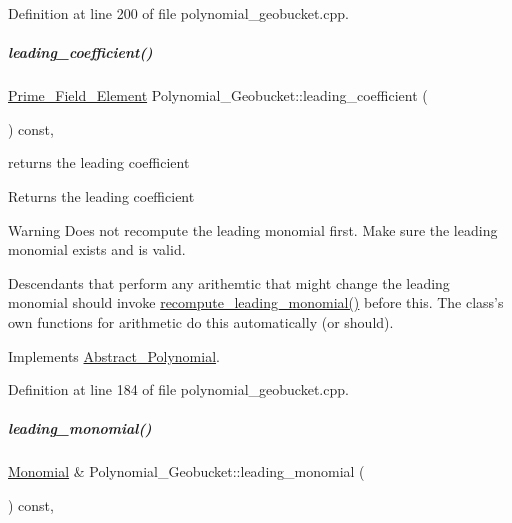 Definition at line 200 of file polynomial\+\_\+geobucket.\+cpp.

\mbox{\label{group__polygroup_a096aa08d1d7be3522c140908989e4dea}} 
\subparagraph{\texorpdfstring{leading\+\_\+coefficient()}{leading\_coefficient()}}
{\footnotesize\ttfamily \hyperlink{group___fields_group_class_prime___field___element}{Prime\+\_\+\+Field\+\_\+\+Element} Polynomial\+\_\+\+Geobucket\+::leading\+\_\+coefficient (\begin{DoxyParamCaption}{ }\end{DoxyParamCaption}) const\hspace{0.3cm}{\ttfamily [override]}, {\ttfamily [virtual]}}



returns the leading coefficient 

\begin{DoxyReturn}{Returns}
the leading coefficient 
\end{DoxyReturn}
\begin{DoxyWarning}{Warning}
Does not recompute the leading monomial first. Make sure the leading monomial exists and is valid. 

Descendants that perform any arithemtic that might change the leading monomial should invoke \hyperlink{group__polygroup_ab57dbe8d5f0d3860997775d9f354ab0c}{recompute\+\_\+leading\+\_\+monomial()} before this. The class's own functions for arithmetic do this automatically (or should). 
\end{DoxyWarning}


Implements \hyperlink{group__polygroup_a511ce8e997fe3fd1141293d256e25fad}{Abstract\+\_\+\+Polynomial}.



Definition at line 184 of file polynomial\+\_\+geobucket.\+cpp.

\mbox{\label{group__polygroup_aeb9d72c577af4de04e1e4cce04a9f41f}} 
\subparagraph{\texorpdfstring{leading\+\_\+monomial()}{leading\_monomial()}}
{\footnotesize\ttfamily \hyperlink{group__polygroup_class_monomial}{Monomial} \& Polynomial\+\_\+\+Geobucket\+::leading\+\_\+monomial (\begin{DoxyParamCaption}{ }\end{DoxyParamCaption}) const\hspace{0.3cm}{\ttfamily [override]}, {\ttfamily [virtual]}}




